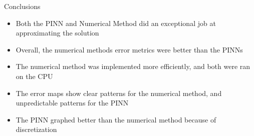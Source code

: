 \documentclass{beamer}
\begin{document}
\begin{frame}{Conclusions}
    \begin{itemize}
        \item Both the PINN and Numerical Method did an exceptional job at approximating the solution
        \item Overall, the numerical methods error metrics were better than the PINNs
        \item The numerical method was implemented more efficiently, and both were ran on the CPU
        \item The error maps show clear patterns for the numerical method, and unpredictable patterns for the PINN
        \item The PINN graphed better than the numerical method because of discretization
    \end{itemize}
\end{frame}
\end{document}
